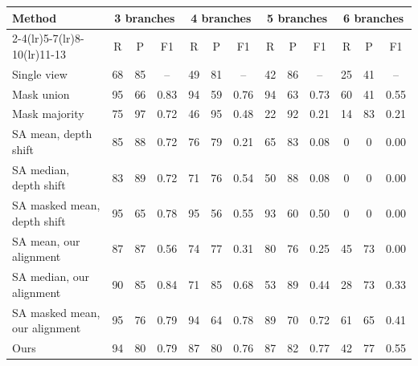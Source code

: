 \begin{tabular}{@{}lcccccccccccc@{}}
\toprule
Method & \multicolumn{3}{c}{3 branches} & \multicolumn{3}{c}{4 branches} & \multicolumn{3}{c}{5 branches} & \multicolumn{3}{c}{6 branches}\\
\cmidrule(lr){2-4}\cmidrule(lr){5-7}\cmidrule(lr){8-10}\cmidrule(lr){11-13}
 & R & P & F1 & R & P & F1 & R & P & F1 & R & P & F1\\
\midrule
Single view & 68 & 85 & -- & 49 & 81 & -- & 42 & 86 & -- & 25 & 41 & --\\
\addlinespace[2pt]
Mask union & 95 & 66 & 0.83 & 94 & 59 & 0.76 & 94 & 63 & 0.73 & 60 & 41 & 0.55\\
Mask majority & 75 & 97 & 0.72 & 46 & 95 & 0.48 & 22 & 92 & 0.21 & 14 & 83 & 0.21\\
\addlinespace[2pt]
SA mean, depth shift & 85 & 88 & 0.72 & 76 & 79 & 0.21 & 65 & 83 & 0.08 & 0 & 0 & 0.00\\
SA median, depth shift & 83 & 89 & 0.72 & 71 & 76 & 0.54 & 50 & 88 & 0.08 & 0 & 0 & 0.00\\
SA masked mean, depth shift & 95 & 65 & 0.78 & 95 & 56 & 0.55 & 93 & 60 & 0.50 & 0 & 0 & 0.00\\
\addlinespace[2pt]
SA mean, our alignment & 87 & 87 & 0.56 & 74 & 77 & 0.31 & 80 & 76 & 0.25 & 45 & 73 & 0.00\\
SA median, our alignment & 90 & 85 & 0.84 & 71 & 85 & 0.68 & 53 & 89 & 0.44 & 28 & 73 & 0.33\\
SA masked mean, our alignment & 95 & 76 & 0.79 & 94 & 64 & 0.78 & 89 & 70 & 0.72 & 61 & 65 & 0.41\\
\addlinespace[2pt]
Ours & 94 & 80 & 0.79 & 87 & 80 & 0.76 & 87 & 82 & 0.77 & 42 & 77 & 0.55\\
\bottomrule
\end{tabular}

